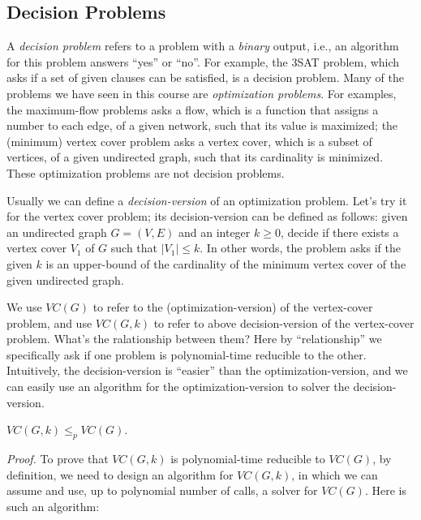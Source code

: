\subsection*{Decision Problems}

A \emph{decision problem} refers to a problem with a \emph{binary} output, i.e., an algorithm
for this problem answers ``yes'' or ``no''.
For example, the 3SAT problem, which asks if a set of given clauses can be satisfied, is a decision problem.
Many of the problems we have seen in this course are \emph{optimization problems}. For examples, the maximum-flow problems
asks a flow, which is a function that assigns a number to each edge, of a given network, such that its value is maximized;
the (minimum) vertex cover problem asks a vertex cover, which is a subset of vertices, of a given undirected graph, 
such that its cardinality is minimized. These optimization problems are not decision problems.

Usually we can define a \emph{decision-version} of an optimization problem. Let's try it for the vertex cover problem;
its decision-version can be defined as follows: given an undirected graph $G = (V, E)$ and an integer $k\ge 0$,
decide if there exists a vertex cover $V_1$ of $G$ such that $|V_1| \le k$. In other words, the problem asks if the
given $k$ is an upper-bound of the cardinality of the minimum vertex cover of the given undirected graph.

We use $VC(G)$ to refer to the (optimization-version) of the vertex-cover problem, and use $VC(G, k)$ to refer to
above decision-version of the vertex-cover problem. What's the ralationship between them? Here by ``relationship''
we specifically ask if one problem is polynomial-time reducible to the other. Intuitively, the decision-version
is ``easier'' than the optimization-version, and we can easily use an algorithm for the optimization-version
to solver the decision-version.
\begin{fact}
$VC(G, k)\le_p VC(G)$.
\end{fact}
\emph{Proof.} To prove that $VC(G,k)$ is polynomial-time reducible to $VC(G)$, by definition, 
we need to design an algorithm for $VC(G, k)$, in which we can assume and use, up to polynomial number of calls,
a solver for $VC(G)$. Here is such an algorithm:

\begin{algorithmblock}[0.8\textwidth]
	\xxx
	\xxx
	\xxx
	\xxx
\end{algorithmblock}

